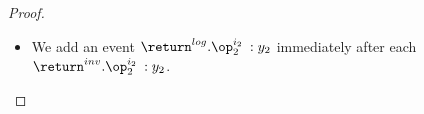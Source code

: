 \begin{proof}
\begin{itemize}
\item We add an event $\return^{log}.\op_2^{i_2} \:: y_2$ immediately after
  each  $\return^{inv}.\op_2^{i_2} \:: y_2$.
\end{itemize}
%
%
\begin{figure}
\def\sep{1.5}
\begin{center}
\unScalaMid
\begin{tikzpicture}

\end{tikzpicture}
\end{center}
\end{figure}
\end{proof}
